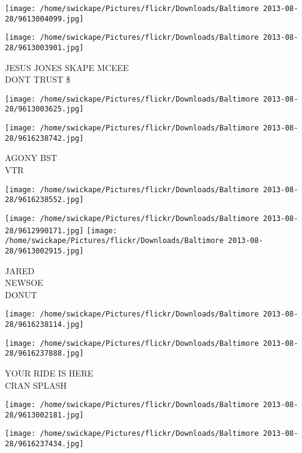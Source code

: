 \documentclass[10pt,letterpaper]{article}
\begin{document}
\texttt{[image: /home/swickape/Pictures/flickr/Downloads/Baltimore 2013-08-28/9613004099.jpg]}

\vspace{0.25in}
\texttt{[image: /home/swickape/Pictures/flickr/Downloads/Baltimore 2013-08-28/9613003901.jpg]}

JESUS JONES SKAPE MCEEE\\
DONT TRUST \$\\
\pagebreak

\texttt{[image: /home/swickape/Pictures/flickr/Downloads/Baltimore 2013-08-28/9613003625.jpg]}

\vspace{0.25in}
\texttt{[image: /home/swickape/Pictures/flickr/Downloads/Baltimore 2013-08-28/9616238742.jpg]}

AGONY BST\\
VTR\\
\pagebreak

\texttt{[image: /home/swickape/Pictures/flickr/Downloads/Baltimore 2013-08-28/9616238552.jpg]}

\vspace{0.25in}
\texttt{[image: /home/swickape/Pictures/flickr/Downloads/Baltimore 2013-08-28/9612990171.jpg]}
\texttt{[image: /home/swickape/Pictures/flickr/Downloads/Baltimore 2013-08-28/9613002915.jpg]}

JARED\\
NEWSOE\\
DONUT\\
\pagebreak

\texttt{[image: /home/swickape/Pictures/flickr/Downloads/Baltimore 2013-08-28/9616238114.jpg]}

\vspace{0.25in}
\texttt{[image: /home/swickape/Pictures/flickr/Downloads/Baltimore 2013-08-28/9616237888.jpg]}

YOUR RIDE IS HERE\\
CRAN SPLASH\\
\pagebreak

\texttt{[image: /home/swickape/Pictures/flickr/Downloads/Baltimore 2013-08-28/9613002181.jpg]}

\vspace{0.25in}
\texttt{[image: /home/swickape/Pictures/flickr/Downloads/Baltimore 2013-08-28/9616237434.jpg]}
\end{document}
